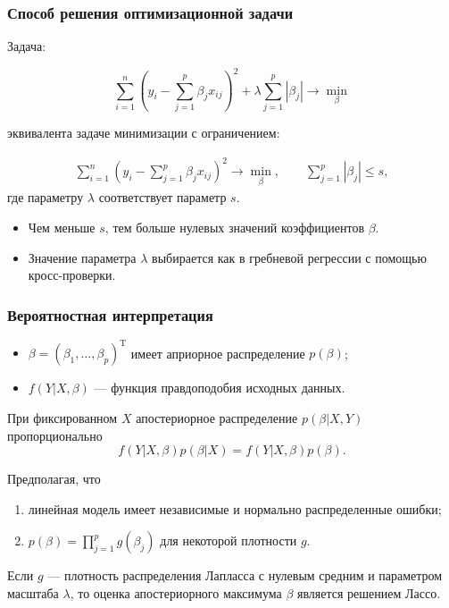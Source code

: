 \documentclass[unicode, notheorems]{beamer}
\newcommand{\T}{\mathrm{T}}
\begin{document}
\begin{frame}
\frametitle{Способ решения оптимизационной задачи}
Задача:

\[\sum_{i=1}^n(y_i - \sum_{j=1}^p \beta_j x_{ij})^2 + \lambda \sum_{j = 1}^p |\beta_j| \rightarrow \min_{\beta}\]

эквивалента задаче минимизации с ограничением:

\begin{align*}
\sum_{i=1}^n(y_i - \sum_{j=1}^p \beta_j x_{ij})^2 \rightarrow \min_{\beta}, \qquad  \sum_{j = 1}^p |\beta_j| \leq s,
\end{align*}
где параметру $\lambda$ соответствует параметр $s$.

\begin{itemize}
\item Чем меньше $s$, тем больше нулевых значений коэффициентов $\beta$.
\item Значение параметра $\lambda$ выбирается как в гребневой регрессии с помощью кросс-проверки.
\end{itemize}

 

\end{frame}

\begin{frame}
\frametitle{Вероятностная интерпретация}

\begin{itemize}
\item $\beta = (\beta_1, \ldots, \beta_p)^{\T}$ имеет априорное распределение $p(\beta)$;
\item $f(Y|X,\beta)$ --- функция правдоподобия исходных данных. 
\end{itemize}

\vspace{0.3cm}
При фиксированном $X$ апостериорное распределение $p(\beta|X,Y)$ пропорционально 
\[f(Y|X,\beta)p(\beta|X) = f(Y|X,\beta)p(\beta).\]

Предполагая, что 
\begin{enumerate}
\item линейная модель имеет независимые и нормально распределенные ошибки; 
\item $p(\beta) = \prod_{j = 1}^p g(\beta_j)$ для некоторой плотности $g$.
\end{enumerate}

\vspace{0.5cm}
Если $g$ --- плотность распределения Лапласса с нулевым средним и параметром масштаба $\lambda$, то оценка апостериорного максимума $\beta$ является решением Лассо. 




\end{frame}
\end{document}

